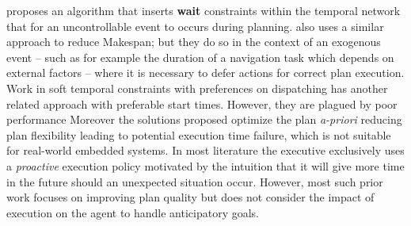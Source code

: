 
\cite{morris01} proposes an algorithm that inserts \textbf{wait}
constraints within the temporal network that for an uncontrollable
event to occurs during planning. \cite{gallien2006} also uses a
similar approach to reduce Makespan; but they do so in the context of
an exogenous event -- such as for example the duration of a navigation
task which depends on external factors -- where it is necessary to
defer actions for correct plan execution. Work in soft temporal
constraints with preferences \cite{khatib2001temporal} on dispatching
has another related approach with preferable start times. However,
they are plagued by poor performance \cite{bartak2002}%
Moreover the solutions proposed optimize the plan {\em a-priori}
reducing plan flexibility leading to potential execution time failure,
which is not suitable for real-world embedded systems. In most
literature the executive exclusively uses a {\em proactive} execution
policy motivated by the intuition that it will give more time in the
future should an unexpected situation occur. However, most such prior
work focuses on improving plan quality but does not consider the
impact of execution on the agent to handle anticipatory goals.


